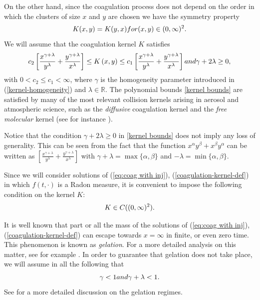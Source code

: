 \documentclass[11pt]{article}
\numberwithin{equation}{section}
\theoremstyle{plain}
\begin{document}
On the other hand, since the coagulation process does not depend on the order in which the clusters of size $x$ and $y$ are chosen we have the symmetry property
\begin{equation}\label{kernel-symmetry}
    K(x,y)=K(y,x) \textup{ for } (x,y)\in(0,\infty)^{2}.
\end{equation}
We will assume that the coagulation kernel $K$ satisfies 
\begin{equation} \label{kernel bounds} 
c_2 \left[  \frac{x^{\gamma+\lambda}}{y^{\lambda}}+\frac
{y^{\gamma+\lambda}}{x^{\lambda}} \right]  \leq K\left(  x,y\right)   \leq c_1 \left[  \frac{x^{\gamma+\lambda}}{y^{\lambda}}+\frac
{y^{\gamma+\lambda}}{x^{\lambda}} \right] \textup{ and } \gamma+2\lambda\geq 0,
\end{equation}
with $0<c_{2}\leq c_{1}<\infty$, where $\gamma$ is the homogeneity parameter introduced in (\ref{kernel-homogeneity}) and $\lambda\in\mathbb{R}$.
 The polynomial bounds \eqref{kernel bounds} are satisfied by many of the most relevant collision kernels arising in aerosol and atmospheric science, such as the \textit{diffusive} coagulation kernel and the \textit{free molecular} kernel (see for instance \cite{Friedlander}).

Notice that the condition $\gamma+2\lambda\geq 0$ in \eqref{kernel bounds} does not imply any loss of generality. This can be seen from the fact that the function $x^{\alpha}y^{\beta}+x^{\beta}y^{\alpha}$ can be written as $\left[  \frac{x^{\gamma+\lambda}}{y^{\lambda}}+\frac
{y^{\gamma+\lambda}}{x^{\lambda}} \right]$ with $\gamma+\lambda=\max\{\alpha,\beta\}$ and $-\lambda=\min\{\alpha,\beta\}$.

Since we will consider solutions of (\ref{eq:coag with inj}), (\ref{coagulation-kernel-def}) in which $f(t, \cdot)$ is a Radon measure, it is convenient to impose the following condition on the kernel $K$:
\begin{equation}\label{kernel cont}
    K\in\textup{C}((0,\infty)^{2}).
\end{equation}

It is well known that part or all the mass of the solutions of (\ref{eq:coag with inj}), (\ref{coagulation-kernel-def}) can escape towards $x=\infty$ in finite, or even zero time. This phenomenon is known as \textit{gelation}. For a more detailed analysis on this matter, see for example \cite{bookBanasiak,gelation_example}. In order to guarantee that gelation does not take place, we will assume in all the following that
\begin{equation}\label{avoid_gelation_parameters}
    \gamma<1 \textup{ and } \gamma+\lambda<1.
\end{equation}
See  \cite{davies1999smoluchowski} for a more detailed discussion on the gelation regimes. 
\end{document}
